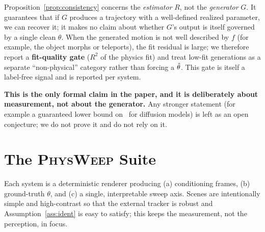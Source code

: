 \begin{remark}
Proposition~\ref{prop:consistency} concerns the \emph{estimator} $R$, not the
\emph{generator} $G$. It guarantees that if $G$ produces a trajectory with a
well-defined realized parameter, we can recover it; it makes no claim about
whether $G$'s output is itself governed by a single clean $\theta$. When the
generated motion is not well described by $f$ (for example, the object morphs
or teleports), the fit residual is large; we therefore report a
\textbf{fit-quality gate} ($R^2$ of the physics fit) and treat low-fit
generations as a separate ``non-physical'' category rather than forcing a
$\hat{\theta}$. This gate is itself a label-free signal and is reported per system.
\end{remark}

\textbf{This is the only formal claim in the paper, and it is deliberately
about measurement, not about the generator.} Any stronger statement (for
example a guaranteed lower bound on \PRI\ for diffusion models) is left as an
open conjecture; we do not prove it and do not rely on it.

\section{The \textsc{PhysWeep} Suite}
\label{sec:suite}

Each system is a deterministic renderer producing (a) conditioning frames, (b)
ground-truth $\theta$, and (c) a single, interpretable sweep axis. Scenes are
intentionally simple and high-contrast so that the external tracker is robust
and Assumption~\ref{ass:ident} is easy to satisfy; this keeps the measurement,
not the perception, in focus.

